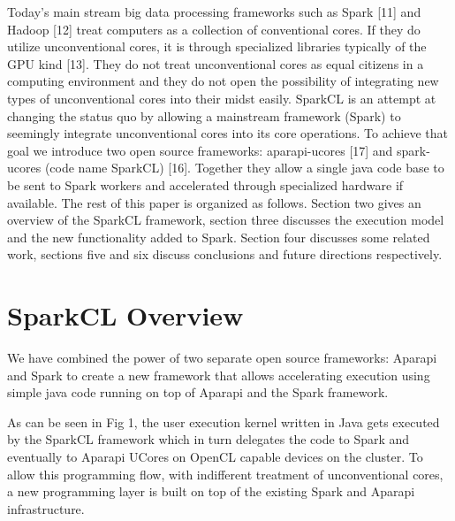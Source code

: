 \documentclass[runningheads,a4paper]{llncs}
\begin{document}
Today’s main stream big data processing frameworks such as Spark [11] and Hadoop [12] treat computers as a collection of conventional cores. If they do utilize unconventional cores, it is through specialized libraries typically of the GPU kind [13]. They do not treat unconventional cores as equal citizens in a computing environment and they do not open the possibility of integrating new types of unconventional cores into their midst easily.
SparkCL is an attempt at changing the status quo by allowing a mainstream framework (Spark) to seemingly integrate unconventional cores into its core operations. To achieve that goal we introduce two open source frameworks: aparapi-ucores [17] and spark-ucores (code name SparkCL) [16]. Together they allow a single java code base to be sent to Spark workers and accelerated through specialized hardware if available.
The rest of this paper is organized as follows. Section two gives an overview of the SparkCL framework, section three discusses the execution model and the new functionality added to Spark. Section four discusses some related work, sections five and six discuss conclusions and future directions respectively.

\section{SparkCL Overview}
We have combined the power of two separate open source frameworks: Aparapi and Spark to create a new framework that allows accelerating execution using simple java code running on top of Aparapi and the Spark framework.

As can be seen in Fig 1, the user execution kernel written in Java gets executed by the SparkCL framework which in turn delegates the code to Spark and eventually to Aparapi UCores on OpenCL capable devices on the cluster. To allow this programming flow, with indifferent treatment of unconventional cores, a new programming layer is built on top of the existing Spark and Aparapi infrastructure.
\end{document}
